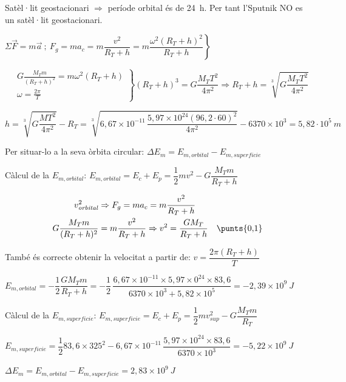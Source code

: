\begin{solapartat}
 Satèl·lit geostacionari $\Rightarrow$ període orbital és de 24~h. Per tant l'Sputnik NO es un satèl·lit geostacionari.

 $\left.\Sigma\vec{F} = m\vec{a}\ ;\ F_g = ma_c = m\dfrac{v^2}{R_T+h} = m\dfrac{\omega^2(R_T+h)^2}{R_T+h}\right\}$

\[ \left.\begin{aligned} &G\frac{M_Tm}{(R_T+h)^2} = m\omega^2(R_T+h)\\ &\omega = \frac{2\pi}{T}\end{aligned}\right\}
(R_T+h)^3 = G\frac{M_TT^2}{4\pi^2} \Rightarrow R_T+h = \sqrt[3]{G\frac{M_TT^2}{4\pi^2}} \]

\[ h = \sqrt[3]{G\frac{MT^2}{4\pi^2}} - R_T = \sqrt[3]{6,67\times 10^{-11}\,\frac{5,97\times 10^{24}(96,2\cdot 60)^2}{4\pi^2}} - 6370\times 10^{3} = 5,82\cdot 10^{5}\ m \]
\end{solapartat}

\begin{solapartat}
Per situar-lo a la seva òrbita circular: $\Delta E_m = E_{m,\mathit{orbital}} - E_{m,\mathit{superficie}}$

Càlcul de la $E_{m,\mathit{orbital}}$: $E_{m,\mathit{orbital}} = E_c + E_p = \dfrac{1}{2}mv^2 - G\dfrac{M_Tm}{R_T+h}$ 

\begin{align*}
v^2_{\mathit{orbital}} &\Rightarrow F_g = ma_c = m\frac{v^2}{R_T+h}\\
G\frac{M_Tm}{(R_T+h)^2} &= m\frac{v^2}{R_T+h} \Rightarrow v^2 = \frac{GM_T}{R_T+h} \quad \text{\punts{0,1}}
\end{align*}

També és correcte obtenir la velocitat a partir de: $v = \dfrac{2\pi(R_T+h)}{T}$

 $E_{m,\mathit{orbital}} = -\dfrac{1}{2}\dfrac{GM_Tm}{R_T+h} = -\dfrac{1}{2}\,\dfrac{6,67\times 10^{-11}\times 5,97\times 0^{24}\times 83,6}{6370\times 10^{3} + 5,82\times 10^{5}} = -2,39\times 10^{9}\ J$

Càlcul de la $E_{m,\mathit{superficie}}$: $E_{m,\mathit{superficie}} = E_c + E_p = \dfrac{1}{2}mv^2_{\mathit{sup}} - G\dfrac{M_Tm}{R_T}$ 

 $E_{m,\mathit{superficie}} = \dfrac{1}{2}83,6\times 325^2 - 6,67\times 10^{-11}\,\dfrac{5,97\times 10^{24}\times 83,6}{6370\times 10^{3}} = -5,22\times 10^{9}\ J$

 $\Delta E_m = E_{m,\mathit{orbital}} - E_{m,\mathit{superficie}} = 2,83\times 10^{9}\ J$
\end{solapartat}

